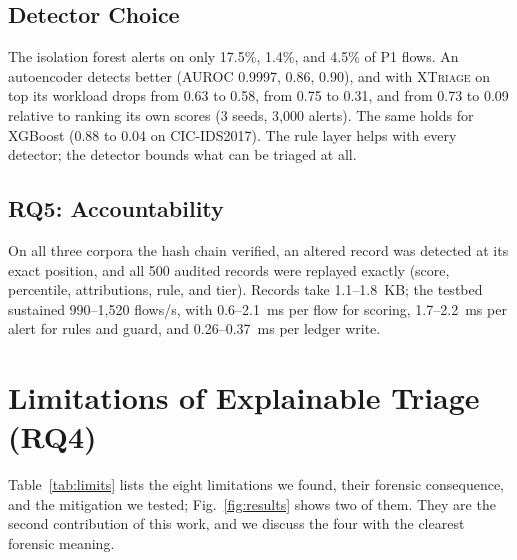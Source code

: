 \documentclass[journal]{IEEEtran}
\begin{document}
\subsection{Detector Choice}
The isolation forest alerts on only 17.5\%, 1.4\%, and 4.5\% of P1 flows. An autoencoder detects better (AUROC 0.9997, 0.86, 0.90), and with \textsc{XTriage} on top its workload drops from 0.63 to 0.58, from 0.75 to 0.31, and from 0.73 to 0.09 relative to ranking its own scores (3 seeds, 3{,}000 alerts). The same holds for XGBoost (0.88 to 0.04 on CIC-IDS2017). The rule layer helps with every detector; the detector bounds what can be triaged at all.

\subsection{RQ5: Accountability}
On all three corpora the hash chain verified, an altered record was detected at its exact position, and all 500 audited records were replayed exactly (score, percentile, attributions, rule, and tier). Records take 1.1--1.8~KB; the testbed sustained 990--1{,}520 flows/s, with 0.6--2.1~ms per flow for scoring, 1.7--2.2~ms per alert for rules and guard, and 0.26--0.37~ms per ledger write.

\section{Limitations of Explainable Triage (RQ4)}
\label{sec:limits}
Table~\ref{tab:limits} lists the eight limitations we found, their forensic consequence, and the mitigation we tested; Fig.~\ref{fig:results} shows two of them. They are the second contribution of this work, and we discuss the four with the clearest forensic meaning.
\end{document}

